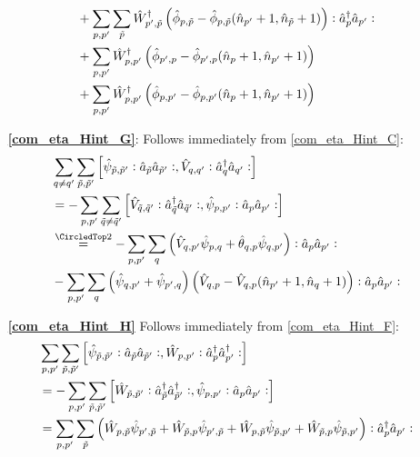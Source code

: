 \begin{appendix}
\begin{itemize}
\begin{align}
&+\sum\limits_{p, p^\prime}\sum\limits_{\tilde p}\hat W_{p^\prime,\tilde p}^\dagger \left(\hat\phi_{p, \tilde p}-\hat\phi_{p, \tilde p}(\hat n_{p^\prime}+1,\hat n_{\tilde p}+1)\right)\vcentcolon\hat a^\dagger_{p}\hat a_{p^\prime}\vcentcolon \nonumber\\
&+\sum\limits_{p, p^\prime}\hat W_{p,p^\prime}^\dagger \left(\hat\phi_{p^\prime,p}-\hat\phi_{p^\prime,p}(\hat n_p+1,\hat n_{p^\prime}+1)\right) \nonumber\\
&+\sum\limits_{p, p^\prime}\hat W_{p,p^\prime}^\dagger \left(\hat\phi_{ p, p^\prime}-\hat\phi_{ p, p^\prime}(\hat n_p+1,\hat n_{p^\prime}+1)\right)\nonumber
\end{align}
\item[\textbf{\ref{com_eta_Hint_G}}:] Follows immediately from \ref{com_eta_Hint_C}:
\begin{subequations}
\begin{align}
&\Sum_{q\neq q^\prime}\Sum_{\tilde p,\tilde p^\prime} \left[\hat\psi_{\tilde p,\tilde p^\prime}\NO\AN_{\tilde p}\AN_{\tilde p^\prime}\NO,\hat V_{q,q^\prime}\NO\CR_q\AN_{q^\prime}\NO\right]\nonumber\\
&=-\Sum_{p,p^\prime} \Sum_{\tilde q\neq \tilde q^\prime}\left[\hat V_{\tilde q,\tilde q^\prime}\NO\CR_{\tilde q}\AN_{\tilde q^\prime}\NO,\hat\psi_{p,p^\prime}\NO\AN_{p}\AN_{p^\prime}\NO\right]\nonumber\\
&\eqsec -\Sum_{p, p^\prime}\Sum_{q}\left(\hat V_{ q, p^\prime}\hat \psi_{p,q}+\hat\theta_{ q, p}\hat \psi_{q,p^\prime}\right)\NO\AN_{p}\AN_{p^\prime}\NO\\
&-\Sum_{p, p^\prime}\Sum_{q}\left(\hat \psi_{q,p^\prime}+\hat \psi_{p^\prime,q}\right) \left(\hat V_{ q,p}-\hat V_{ q,p}(\hat n_{p^\prime}+1,\hat n_{q}+1)\right)\NO\AN_{p}\AN_{p^\prime}\NO\nonumber
\end{align}
\end{subequations}
\item[\textbf{\ref{com_eta_Hint_H}}] Follows immediately from \ref{com_eta_Hint_F}:
\begin{align}
&\Sum_{p, p^\prime}\Sum_{\tilde p,\tilde p^\prime} \left[\hat\psi_{\tilde p,\tilde p^\prime}\NO\AN_{\tilde p}\AN_{\tilde p^\prime}\NO,\hat W_{p,p^\prime}\NO\CR_p\CR_{p^\prime}\NO\right]\nonumber\\
&=-\Sum_{p, p^\prime}\Sum_{\tilde p,\tilde p^\prime} \left[\hat W_{\tilde p,\tilde p^\prime}\NO\CR_{\tilde p}\CR_{\tilde p^\prime}\NO,\hat\psi_{p, p^\prime}\NO\AN_{p}\AN_{p^\prime}\NO\right]\\
&=\Sum_{p, p^\prime}\Sum_{\tilde p} \left(\hat W_{p,\tilde p}\hat \psi_{p^\prime,\tilde p}+\hat W_{\tilde p,p}\hat \psi_{p^\prime,\tilde p}+\hat W_{p,\tilde p}\hat \psi_{\tilde p,p^\prime}  + \hat W_{\tilde p,p}\hat \psi_{\tilde p,p^\prime}\right)\NO\CR_{p}\AN_{p^\prime}\NO \\

\end{align}
\end{itemize}
\end{appendix}
